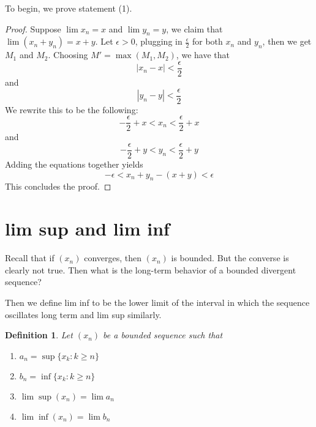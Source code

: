 \documentclass{article}
\newtheorem{definition}[theorem]{Definition}
\newtheorem{one minute paper}[theorem]{One Minute Paper}
\begin{document}
To begin, we prove statement (1). 

\begin{proof}
    Suppose $\lim x_n = x$ and $\lim y_n = y$, we claim that $\lim (x_n + y_n) = x + y$. Let $\epsilon > 0$, 
    plugging in $\frac{\epsilon}{2}$ for both $x_n$ and $y_n$, then we get $M_1$ and $M_2$. Choosing $M' = \max(M_1, M_2)$, we have that 
    \begin{equation}
        |x_n - x| < \frac{\epsilon}{2}
    \end{equation}
    and
    \begin{equation}
        |y_n - y| < \frac{\epsilon}{2}
    \end{equation}
    We rewrite this to be the following:
    \begin{equation}
        -\frac{\epsilon}{2} + x < x_n < \frac{\epsilon}{2} + x
    \end{equation}
    and
    \begin{equation}
        -\frac{\epsilon}{2} + y < y_n < \frac{\epsilon}{2} + y
    \end{equation}
    Adding the equations together yields
    \begin{equation}
        -\epsilon < x_n + y_n - (x + y) < \epsilon
    \end{equation}
    This concludes the proof. 
\end{proof}

\section*{lim sup and lim inf}

Recall that if $(x_n)$ converges, then $(x_n)$ is bounded. But the converse is clearly not true. Then what is the long-term behavior of a bounded divergent sequence?

Then we define lim inf to be the lower limit of the interval in which the sequence oscillates long term and lim sup similarly.

\begin{definition}
    Let $(x_n)$ be a bounded sequence such that
    \begin{enumerate}
        \item $a_n = \sup\{x_k : k \geq n\}$
        \item $b_n = \inf\{x_k : k \geq n\}$
        \item $\lim \sup(x_n) = \lim a_n$
        \item $\lim \inf(x_n) = \lim b_n$
    \end{enumerate}
\end{definition}
\end{document}
